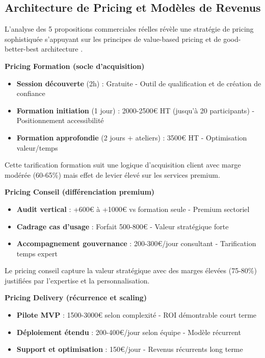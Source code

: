 \subsection{Architecture de Pricing et Modèles de Revenus}

L'analyse des 5 propositions commerciales réelles \cite{luwai2025aesio,luwai2025antilogy,luwai2025integrhale,luwai2025carecall,luwai2025tectona} révèle une stratégie de pricing sophistiquée s'appuyant sur les principes de value-based pricing et de good-better-best architecture \cite{nagle2011strategy}.

\textbf{Pricing Formation (socle d'acquisition)}
\begin{itemize}
    \item \textbf{Session découverte} (2h) : Gratuite - Outil de qualification et de création de confiance
    \item \textbf{Formation initiation} (1 jour) : 2000-2500€ HT (jusqu'à 20 participants) - Positionnement accessibilité
    \item \textbf{Formation approfondie} (2 jours + ateliers) : 3500€ HT - Optimisation valeur/temps
\end{itemize}

Cette tarification formation suit une logique d'acquisition client avec marge modérée (60-65\%) mais effet de levier élevé sur les services premium.

\textbf{Pricing Conseil (différenciation premium)}
\begin{itemize}
    \item \textbf{Audit vertical} : +600€ à +1000€ vs formation seule - Premium sectoriel
    \item \textbf{Cadrage cas d'usage} : Forfait 500-800€ - Valeur stratégique forte
    \item \textbf{Accompagnement gouvernance} : 200-300€/jour consultant - Tarification temps expert
\end{itemize}

Le pricing conseil capture la valeur stratégique avec des marges élevées (75-80\%) justifiées par l'expertise et la personnalisation.

\textbf{Pricing Delivery (récurrence et scaling)}
\begin{itemize}
    \item \textbf{Pilote MVP} : 1500-3000€ selon complexité - ROI démontrable court terme
    \item \textbf{Déploiement étendu} : 200-400€/jour selon équipe - Modèle récurrent
    \item \textbf{Support et optimisation} : 150€/jour - Revenus récurrents long terme
\end{itemize}

